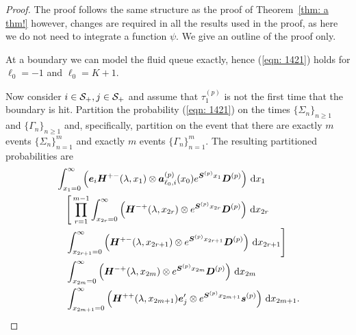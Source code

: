 \begin{proof}
	The proof follows the same structure as the proof of Theorem~\ref{thm: a thm!} however, changes are required in all the results used in the proof, as here we do not need to integrate a function \(\psi\). We give an outline of the proof only. 

	At a boundary we can model the fluid queue exactly, hence (\ref{eqn: 1421}) holds for \(\ell_0=-1\) and \(\ell_0=K+1\).

	Now consider \(i\in \mathcal{S}_+,j\in\mathcal{S}_+\) and assume that \(\tau_1^{(p)}\) is not the first time that the boundary is hit. Partition the probability (\ref{eqn: 1421}) on the times \(\{\Sigma_n\}_{n\geq 1}\) and \(\{\Gamma_n\}_{n\geq 1}\) and, specifically, partition on the event that there are exactly \(m\) events \(\{\Sigma_n\}_{n=1}^m\) and exactly \(m\) events \(\{\Gamma_n\}_{n=1}^m\). 
	The resulting partitioned probabilities are
	\begin{align}
                 &\int_{x_1=0}^\infty \left(\boldsymbol e_i\boldsymbol H^{+-}(\lambda,x_1)\otimes \boldsymbol a_{\ell_0,i}^{(p)}(x_0)e^{\boldsymbol{S}^{(p)}x_1}\boldsymbol{D}^{(p)}\right)\, \mathrm{d} x_1 \nonumber
            	\\&\nonumber \quad \Bigg[\prod_{r=1}^{m-1} \int_{x_{2r}=0}^\infty \left(\boldsymbol H^{-+}(\lambda,x_{2r}) \otimes e^{\boldsymbol{S}^{(p)}x_{2r}}\boldsymbol D^{(p)}\right)\, \mathrm{d} x_{2r} \\&\quad \int_{x_{2r+1}=0}^\infty \left(\boldsymbol H^{+-}(\lambda,x_{2r+1}) \otimes e^{\boldsymbol{S}^{(p)}x_{2r+1}}\boldsymbol D^{(p)}\right) \, \mathrm{d} x_{2r+1}\Bigg] \nonumber
            	\\&
            	\quad \int_{x_{2m}=0}^\infty \left(\boldsymbol H^{-+}(\lambda, x_{2m}) \otimes e^{\boldsymbol{S}^{(p)}x_{2m}}\boldsymbol{D}^{(p)}\right) \, \mathrm{d} x_{2m} \nonumber
				\\&\quad \int_{x_{2m+1}=0}^\infty \left( \boldsymbol H^{++}(\lambda,x_{2m+1})\boldsymbol e_j'{} \otimes  e^{\boldsymbol{S}^{(p)}x_{2m+1}}\boldsymbol s^{(p)} \right) \, \mathrm{d} x_{2m+1}.  \label{eqn: prob ofjaiv}
	\end{align}


\end{proof}
